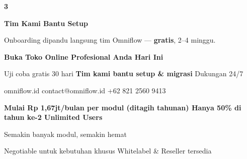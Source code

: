 \documentclass[a4paper]{article}
\begin{document}
\begin{center}
\begin{minipage}[t]{0.318\textwidth}
{\begin{minipage}[t][4.7cm][c]{\dimexpr\linewidth-2\fboxsep\relax}
            \begin{center}{\fontsize{22}{26}\selectfont\bfseries\color{BluePrimary} 3}\end{center}
            \vspace{2pt}
            \begin{center}
                {\fontsize{10}{13}\selectfont\bfseries\color{BlueDark} Tim Kami Bantu Setup}\par\vspace{3pt}
                {\fontsize{9}{12}\selectfont\color{TextDark} Onboarding dipandu langsung tim Omniflow --- \textbf{gratis}, 2--4 minggu.}
            \end{center}
        \end{minipage}}
\end{minipage}
\end{center}

\vspace{8pt}

{\setlength{\fboxsep}{10pt}\setlength{\fboxrule}{0pt}%
\noindent\colorbox{BluePrimary}{%
    \begin{minipage}{\dimexpr\textwidth-2\fboxsep\relax}
        \centering
        {\fontsize{13}{16}\selectfont\bfseries\color{White}
        Buka Toko Online Profesional Anda Hari Ini}\par\vspace{3pt}
        {\fontsize{9.5}{12}\selectfont\color{BlueMid}
        Uji coba gratis 30 hari \enspace\textbullet\enspace \textbf{Tim kami bantu setup \& migrasi} \enspace\textbullet\enspace Dukungan 24/7}\par\vspace{2pt}
        {\fontsize{9.5}{12}\selectfont\color{BlueLight}
        omniflow.id \enspace\textbullet\enspace contact@omniflow.id \enspace\textbullet\enspace +62 821 2560 9413}
    \end{minipage}}}

\vspace{6pt}

{\setlength{\fboxsep}{8pt}\setlength{\fboxrule}{0pt}%
\noindent\colorbox{BlueBg}{%
    \begin{minipage}{\dimexpr\textwidth-2\fboxsep\relax}
        \centering
        {\fontsize{9}{12}\selectfont\bfseries\color{BluePrimary}
        Mulai Rp 1,67jt/bulan per modul (ditagih tahunan) \enspace\textbullet\enspace Hanya 50\% di tahun ke-2 \enspace\textbullet\enspace Unlimited Users}\par\vspace{1pt}
        {\fontsize{8.5}{11}\selectfont\color{BlueDark}
        Semakin banyak modul, semakin hemat}\par\vspace{1pt}
        {\fontsize{8}{10}\selectfont\color{TextLight}
        Negotiable untuk kebutuhan khusus \enspace\textbullet\enspace Whitelabel \& Reseller tersedia}
    \end{minipage}}}


\pagestyle{empty}
\restoregeometry
\end{document}
